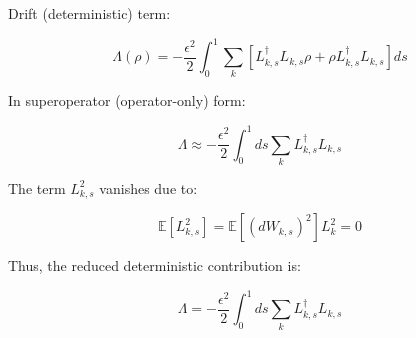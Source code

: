 \documentclass[9pt,a4paper,twocolumn,twoside]{tau-class/tau}
\begin{document}
Drift (deterministic) term:

\begin{equation}
\Lambda(\rho) = -\frac{\epsilon^2}{2} \int_0^1 \sum_k \left[ L_{k,s}^\dagger L_{k,s} \rho + \rho L_{k,s}^\dagger L_{k,s} \right] ds
\end{equation}

In superoperator (operator-only) form:

\begin{equation}
\Lambda \approx -\frac{\epsilon^2}{2} \int_0^1 ds \sum_k L_{k,s}^\dagger L_{k,s}
\end{equation}

The term \( L_{k,s}^2 \) vanishes due to:

\begin{equation}
\mathbb{E}[L_{k,s}^2] = \mathbb{E}[(dW_{k,s})^2] L_k^2 = 0
\end{equation}

Thus, the reduced deterministic contribution is:

\begin{equation}
\Lambda = -\frac{\epsilon^2}{2} \int_0^1 ds \sum_k L_{k,s}^\dagger L_{k,s}
\end{equation}
\end{document}
